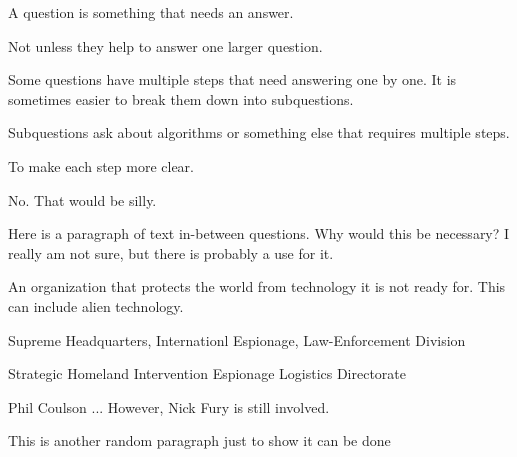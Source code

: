 \documentclass{hwByKicker}
\begin{document}
A question is something that needs an answer. 

Not unless they help to answer one larger question. 

Some questions have multiple steps that need answering one 
by one. 
It is sometimes easier to break them down into subquestions.

Subquestions ask about algorithms or something else that 
requires multiple steps. 

To make each step more clear. 

No. That would be silly.

\hwresetmargin
Here is a paragraph of text in-between questions. 
Why would this be necessary? 
I really am not sure, but there is probably a use for it. 

An organization that protects the world from technology it 
is not ready for. 
This can include alien technology. 

Supreme Headquarters, Internationl Espionage, Law-Enforcement 
Division

Strategic Homeland Intervention Espionage Logistics Directorate 

Phil Coulson ... However, Nick Fury is still involved. 

\hwresetmargin
This is another random paragraph just to show it can be done
\end{document}
